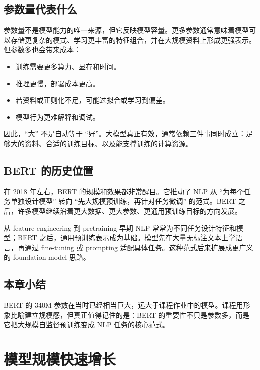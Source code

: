 \documentclass[a4paper]{article}
\begin{document}
\subsection{参数量代表什么}

参数量不是模型能力的唯一来源，但它反映模型容量。更多参数通常意味着模型可以存储更复杂的模式、学习更丰富的特征组合，并在大规模资料上形成更强表示。但参数多也会带来成本：

\begin{itemize}
    \item 训练需要更多算力、显存和时间。
    \item 推理更慢，部署成本更高。
    \item 若资料或正则化不足，可能过拟合或学习到偏差。
    \item 模型行为更难解释和调试。
\end{itemize}

因此，``大'' 不是自动等于 ``好''。大模型真正有效，通常依赖三件事同时成立：足够大的资料、合适的训练目标、以及能支撑训练的计算资源。

\subsection{BERT 的历史位置}

在 2018 年左右，BERT 的规模和效果都非常醒目。它推动了 NLP 从 ``为每个任务单独设计模型'' 转向 ``先大规模预训练，再针对任务微调'' 的范式。BERT 之后，许多模型继续沿着更大数据、更大参数、更通用预训练目标的方向发展。

\begin{knowledgebox}{从 feature engineering 到 pretraining}
    早期 NLP 常常为不同任务设计特征和模型；BERT 之后，通用预训练表示成为基础。模型先在大量无标注文本上学语言，再通过 fine-tuning 或 prompting 适配具体任务。这种范式后来扩展成更广义的 foundation model 思路。
\end{knowledgebox}

\subsection{本章小结}

BERT 的 340M 参数在当时已经相当巨大，远大于课程作业中的模型。课程用形象比喻建立规模感，但真正值得记住的是：BERT 的重要性不只是参数多，而是它把大规模自监督预训练变成 NLP 任务的核心范式。

\section{模型规模快速增长}
\end{document}
